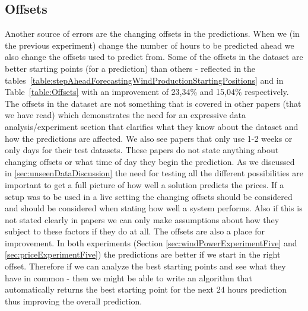\subsection{Offsets}
\label{sec:offsetsDiscussion}
Another source of errors are the changing offsets in the predictions. When we (in the previous experiment) change the number of hours to be predicted ahead we also change the offsets used to predict from. Some of the offsets in the dataset are better starting points (for a prediction) than others - reflected in the tables~\ref{table:stepAheadForecastingWindProductionStartingPositions} and in Table~\ref{table:Offsets} with an improvement of 23,34\% and 15,04\% respectively. The offsets in the dataset are not something that is covered in other papers (that we have read) which demonstrates the need for an expressive data analysis/experiment section that clarifies what they know about the dataset and how the predictions are affected. We also see papers that only use 1-2 weeks\cite{yamin2004adaptive} or only days \cite{1, singhal2011electricity, pjmForecast} for their test datasets. These papers do not state anything about changing offsets or what time of day they begin the prediction. As we discussed in \ref{sec:unseenDataDiscussion} the need for testing all the different possibilities are important to get a full picture of how well a solution predicts the prices. If a setup was to be used in a live setting the changing offsets should be considered and should be considered when stating how well a system performs. Also if this is not stated clearly in papers we can only make assumptions about how they subject to these factors if they do at all. The offsets are also a place for improvement. In both experiments (Section \ref{sec:windPowerExperimentFive} and \ref{sec:priceExperimentFive}) the predictions are better if we start in the right offset. Therefore if we can analyze the best starting points and see what they have in common - then we might be able to write an algorithm that automatically returns the best starting point for the next 24 hours prediction thus improving the overall prediction.